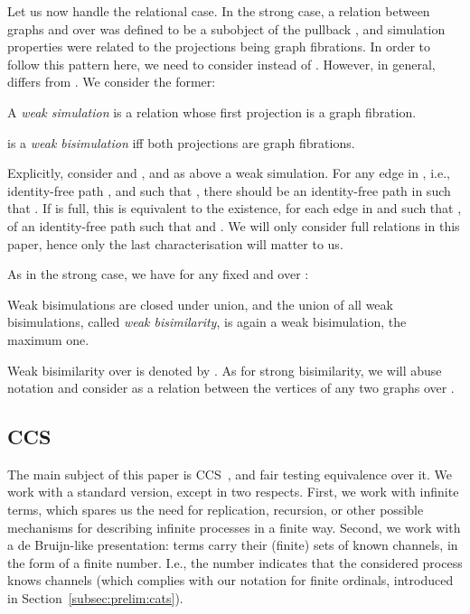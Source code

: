 \documentclass{LMCS}
\theoremstyle{plain}\newtheorem{satz}[thm]{Satz}
\begin{document}
Let us now handle the relational case.  In the strong case, a relation
between graphs  and  over  was defined to be a subobject of
the pullback , and simulation properties were related
to the projections being graph fibrations. In order to follow this
pattern here, we need to consider  instead of
. However, in general,  differs from . We consider the
former:
\begin{defi}
  A \emph{weak simulation}  is a relation  whose first projection  is a
  graph fibration.
  
   is a \emph{weak bisimulation} iff both projections are graph
  fibrations.
\end{defi}
Explicitly, consider  and , and
 as above a weak simulation. For any edge  in
, i.e., identity-free path ,
and  such that , there should be an identity-free
path  in  such that .  If
 is full, this is equivalent to the existence, for each edge  in  and  such that , of an
identity-free path  such that 
and . We will only consider
full relations in this paper, hence only the last characterisation
will matter to us.

As in the strong case, we have for any fixed  and  over :
\begin{prop}
  Weak bisimulations are closed under union, and the union of all weak
  bisimulations, called \emph{weak bisimilarity}, is again a weak
  bisimulation, the maximum one.
\end{prop}
\begin{notation}
  Weak bisimilarity over  is denoted by . As for strong
  bisimilarity, we will abuse notation and consider  as a
  relation between the vertices of any two graphs over .
\end{notation}


\subsection{CCS}
The main subject of this paper is CCS~\cite{Milner89}, and fair
testing equivalence over it.  We work with a standard version, except
in two respects. First, we work with infinite terms, which spares us
the need for replication, recursion, or other possible mechanisms for
describing infinite processes in a finite way.  Second, we work with a
de Bruijn-like presentation: terms carry their (finite) sets of known
channels, in the form of a finite number. I.e., the number 
indicates that the considered process knows channels 
(which complies with our notation for finite ordinals, introduced in
Section~\ref{subsec:prelim:cats}).
\end{document}

